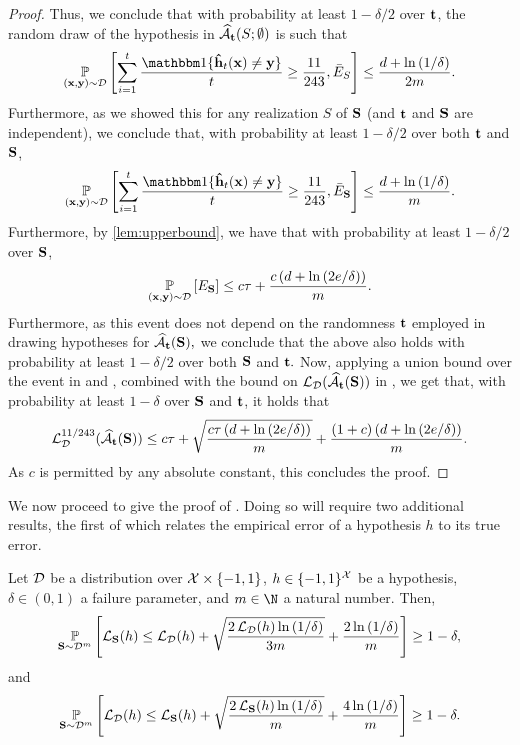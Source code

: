 \begin{proof}
Thus, we conclude that with probability at least $1 - \delta/2$ over $\mathbf{t}$, the random draw of the hypothesis in $ \widehat{\mathcal{A}}_{\mathbf{t}}(S;\emptyset) $ is such that  
\[ \p_{(\rx,\ry)\sim \cD}\left[\sum_{i=1}^{t} \frac{\ind\{   \rh_{t}(\rx)\not=\ry\}}{t} \geq \frac{11}{243} , \bar{E}_{S}\right]\leq \frac{d+\ln{\left(1/\delta \right)}}{2m}. \]  
Furthermore, as we showed this for any realization $S$  of $\mathbf{S}$ (and $ \mathbf{t} $ and $ \mathbf{S} $ are independent), we conclude that, with probability at least $ 1-\delta/2$ over both $ \mathbf{t} $ and $ \mathbf{S} $,
\[ \p_{(\rx,\ry)\sim \cD}\left[\sum_{i=1}^{t} \frac{\ind\{   \rh_{t}(\rx)\not=\ry\}}{t} \geq \frac{11}{243}, \bar{E}_{\rS}\right]\leq \frac{d+\ln{\left(1/\delta \right)}}{m}.\] 
Furthermore, by \cref{lem:upperbound}, we have that with probability at least $ 1-\delta/2 $ over $ \mathbf{S} $, 
\begin{align}\label{eq:uppsampledbound3}
    \operatorname*{\mathbb{P}}_{(\mathbf{x},\mathbf{y})\sim\mathcal{D}}\left[E_{\mathbf{S}}\right]\leq   c\tau +\frac{c\left(d+\ln{(2e/\delta )}\right)}{m}.
\end{align}
Furthermore, as this event does not depend on the randomness $ \mathbf{t} $ employed in drawing hypotheses for $ \widehat{\mathcal{A}}_{\mathbf{t}}(\mathbf{S}),$ we conclude that the above also holds with probability at least $ 1-\delta/2 $ over both $ \mathbf{S} $ and $ \mathbf{t}.$ 
Now, applying a union bound over the event in  and , combined with the bound on $ \operatorname{\mathcal{L}}_{\mathcal{D}}(\widehat{\mathcal{A}}_{\mathbf{t}}(\mathbf{S})) $ in , we get that, with probability at least $ 1-\delta $ over $ \mathbf{S} $ and $ \mathbf{t} $, it holds that 
\begin{align*}
    \operatorname{\mathcal{L}}_{\mathcal{D}}^{11/243}(\widehat{\mathcal{A}}_{\mathbf{t}}(\mathbf{S}))\leq c\tau +\sqrt{\frac{c\tau \left(d+\ln{(2e/\delta )}\right)}{m}}+\frac{(1+c)\left(d+\ln{(2e/\delta )}\right)}{m}.
\end{align*}
As $c$ is permitted by any absolute constant, this concludes the proof. 
\end{proof}

We now proceed to give the proof of . Doing so will require two additional results, the first of which relates the empirical error of a hypothesis $h$ to its true error. 


\begin{lemma}\label{lem:additiveerrorhstar}
Let $\mathcal{D}$ be a distribution over $\mathcal{X} \times \{-1, 1\}$, $h \in \{-1, 1\}^{\mathcal{X}}$ be a hypothesis, $\delta \in (0, 1)$ a failure parameter, and $m \in \N$ a natural number. Then, 
    \begin{align*}
        \operatorname*{\mathbb{P}}_{\mathbf{S} \sim \mathcal{D}^m}\left[\operatorname{\mathcal{L}}_{\mathbf{S}}(h)\leq \operatorname{\mathcal{L}}_{\mathcal{D}}(h) +\sqrt{\frac{2\operatorname{\mathcal{L}}_{\mathcal{D}}(h)\ln{(1/\delta )}}{3m}}+\frac{2\ln{(1/\delta )}}{m} \right] 
        \geq 1-\delta,
    \end{align*}
and 
\begin{align*}
    \operatorname*{\mathbb{P}}_{\mathbf{S} \sim \mathcal{D}^m} \left[\operatorname{\mathcal{L}}_{\mathcal{D}}(h)\leq \operatorname{\mathcal{L}}_{\mathbf{S}}(h) +\sqrt{\frac{2\operatorname{\mathcal{L}}_{\mathbf{S}}(h)\ln{(1/\delta )}}{m}}+\frac{4\ln{(1/\delta )}}{m} \right] 
    \geq 1-\delta.
\end{align*}  
\end{lemma}

